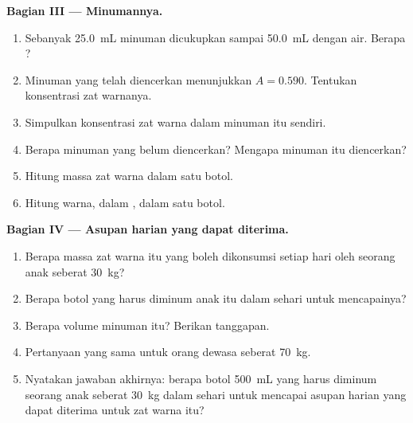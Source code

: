 \begin{problem}
\medskip
\noindent\textbf{Bagian III --- Minumannya.}
\begin{enumerate}[resume]
  \item Sebanyak \qty{25.0}{mL} minuman dicukupkan sampai \qty{50.0}{mL}
        dengan air. Berapa ?
  \item Minuman yang telah diencerkan menunjukkan $A = 0.590$. Tentukan
        konsentrasi zat warnanya.
  \item Simpulkan konsentrasi zat warna dalam minuman itu sendiri.
  \item Berapa  minuman yang belum diencerkan? Mengapa minuman
        itu diencerkan?
  \item Hitung massa zat warna dalam satu botol.
  \item Hitung  warna, dalam , dalam satu botol.
\end{enumerate}

\medskip
\noindent\textbf{Bagian IV --- Asupan harian yang dapat diterima.}
\begin{enumerate}[resume]
  \item Berapa massa zat warna itu yang boleh dikonsumsi setiap hari oleh
        seorang anak seberat \qty{30}{kg}?
  \item Berapa botol yang harus diminum anak itu dalam sehari untuk
        mencapainya?
  \item Berapa volume minuman itu? Berikan tanggapan.
  \item Pertanyaan yang sama untuk orang dewasa seberat \qty{70}{kg}.
  \item Nyatakan jawaban akhirnya: berapa botol \qty{500}{mL} yang harus
        diminum seorang anak seberat \qty{30}{kg} dalam sehari untuk
        mencapai asupan harian yang dapat diterima untuk zat warna itu?
\end{enumerate}
\end{problem}
